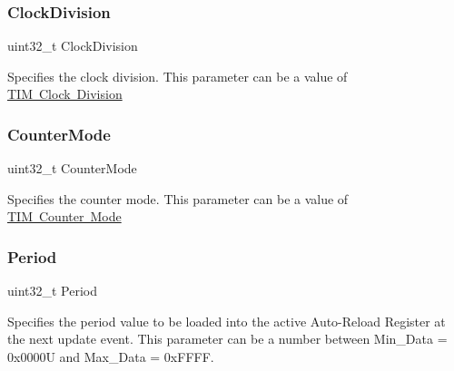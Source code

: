 \subsubsection{\texorpdfstring{Clock\+Division}{ClockDivision}}
{\footnotesize\ttfamily uint32\+\_\+t Clock\+Division}

Specifies the clock division. This parameter can be a value of \mbox{\hyperlink{group___t_i_m___clock_division}{T\+IM Clock Division}} \mbox{\label{struct_t_i_m___base___init_type_def_a4b29303489c983d0e9326d7ae0196ceb}} 
\subsubsection{\texorpdfstring{Counter\+Mode}{CounterMode}}
{\footnotesize\ttfamily uint32\+\_\+t Counter\+Mode}

Specifies the counter mode. This parameter can be a value of \mbox{\hyperlink{group___t_i_m___counter___mode}{T\+IM Counter Mode}} \mbox{\label{struct_t_i_m___base___init_type_def_a49500eef6a2354eeee4adc005bf9cef6}} 
\subsubsection{\texorpdfstring{Period}{Period}}
{\footnotesize\ttfamily uint32\+\_\+t Period}

Specifies the period value to be loaded into the active Auto-\/\+Reload Register at the next update event. This parameter can be a number between Min\+\_\+\+Data = 0x0000U and Max\+\_\+\+Data = 0x\+F\+F\+FF. \mbox{\label{struct_t_i_m___base___init_type_def_affb82025da5b8d4a06e61f1690460f4d}} 
